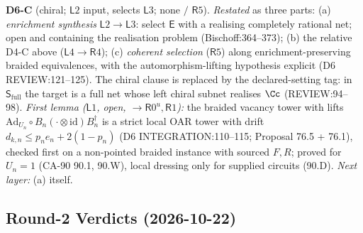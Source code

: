 \textbf{D6-C} (chiral; \(\mathsf L2\) input, selects \(\mathsf L3\); none \(/\) \(\mathsf R5\)).  \emph{Restated} as three
parts: (a) \emph{enrichment synthesis} \(\mathsf L2\to\mathsf L3\): select \(\mathsf E\) with a realising completely
rational net; open and containing the realisation problem (Bischoff:364--373); (b) the relative D4-C above
(\(\mathsf L4\to\mathsf R4\)); (c) \emph{coherent selection} (\(\mathsf R5\)) along enrichment-preserving braided
equivalences, with the automorphism-lifting hypothesis explicit (D6 REVIEW:121--125).  The chiral clause is replaced by
the declared-setting tag: in \(\mathsf S_{\mathrm{full}}\) the target is a full net whose left chiral subnet realises
\(\Cc\) (REVIEW:94--98).  \emph{First lemma (\(\mathsf L1\), open, \(\to\mathsf R0^u,\mathsf R1\)):} the braided vacancy
tower with lifts \(\mathrm{Ad}_{U_n}\circ B_n(\cdot\otimes\mathrm{id})B_n^\dagger\) is a strict local OAR tower with drift
\(d_{k,n}\le p_ne_n+2(1-p_n)\) (D6 INTEGRATION:110--115; Proposal 76.5 + 76.1), checked first on a non-pointed braided
instance with sourced \(F,R\); proved for \(U_n=1\) (CA-90 90.1, 90.W), local dressing only for supplied circuits (90.D).
\emph{Next layer:} (a) itself.

\subsection{Round-2 Verdicts (2026-10-22)}
\label{sec:round2-verdicts}


